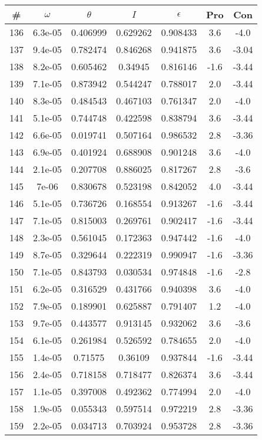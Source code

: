 \begin{table}
\begin{tabular}{c|c|c|c|c|c|c}
\# & $\omega$ & $\theta$ & $I$ & $\epsilon$ & Pro & Con\\
\hline
136 & 6.3e-05 & 0.406999 & 0.629262 & 0.908433 & 3.6 & -4.0\\
137 & 9.4e-05 & 0.782474 & 0.846268 & 0.941875 & 3.6 & -3.04\\
138 & 8.2e-05 & 0.605462 & 0.34945 & 0.816146 & -1.6 & -3.44\\
139 & 7.1e-05 & 0.873942 & 0.544247 & 0.788017 & 2.0 & -3.44\\
140 & 8.3e-05 & 0.484543 & 0.467103 & 0.761347 & 2.0 & -4.0\\
141 & 5.1e-05 & 0.744748 & 0.422598 & 0.838794 & 3.6 & -3.44\\
142 & 6.6e-05 & 0.019741 & 0.507164 & 0.986532 & 2.8 & -3.36\\
143 & 6.9e-05 & 0.401924 & 0.688908 & 0.901248 & 3.6 & -4.0\\
144 & 2.1e-05 & 0.207708 & 0.886025 & 0.817267 & 2.8 & -3.6\\
145 & 7e-06 & 0.830678 & 0.523198 & 0.842052 & 4.0 & -3.44\\
146 & 5.1e-05 & 0.736726 & 0.168554 & 0.913267 & -1.6 & -3.44\\
147 & 7.1e-05 & 0.815003 & 0.269761 & 0.902417 & -1.6 & -3.44\\
148 & 2.3e-05 & 0.561045 & 0.172363 & 0.947442 & -1.6 & -4.0\\
149 & 8.7e-05 & 0.329644 & 0.222319 & 0.990947 & -1.6 & -3.36\\
150 & 7.1e-05 & 0.843793 & 0.030534 & 0.974848 & -1.6 & -2.8\\
151 & 6.2e-05 & 0.316529 & 0.431766 & 0.940398 & 3.6 & -4.0\\
152 & 7.9e-05 & 0.189901 & 0.625887 & 0.791407 & 1.2 & -4.0\\
153 & 9.7e-05 & 0.443577 & 0.913145 & 0.932062 & 3.6 & -3.6\\
154 & 6.1e-05 & 0.261984 & 0.526592 & 0.784655 & 2.0 & -4.0\\
155 & 1.4e-05 & 0.71575 & 0.36109 & 0.937844 & -1.6 & -3.44\\
156 & 2.4e-05 & 0.718158 & 0.718477 & 0.826374 & 3.6 & -3.44\\
157 & 1.1e-05 & 0.397008 & 0.492362 & 0.774994 & 2.0 & -4.0\\
158 & 1.9e-05 & 0.055343 & 0.597514 & 0.972219 & 2.8 & -3.36\\
159 & 2.2e-05 & 0.034713 & 0.703924 & 0.953728 & 2.8 & -3.36\\

\end{tabular}
\end{table}
